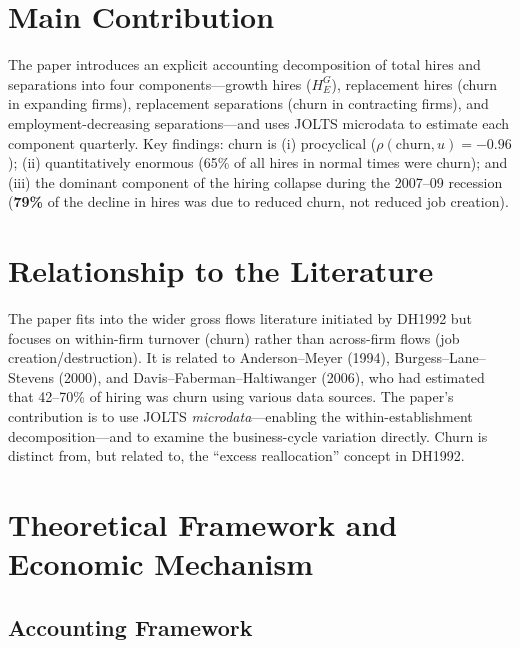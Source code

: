 \section{Main Contribution}

The paper introduces an explicit accounting decomposition of total hires and
separations into four components---growth hires ($H^G_E$), replacement hires
(churn in expanding firms), replacement separations (churn in contracting
firms), and employment-decreasing separations---and uses JOLTS microdata to
estimate each component quarterly. Key findings: churn is (i) procyclical
($\rho(\text{churn},u) = -0.96$); (ii) quantitatively enormous (65\% of all
hires in normal times were churn); and (iii) the dominant component of the
hiring collapse during the 2007--09 recession (\textbf{79\%} of the decline
in hires was due to reduced churn, not reduced job creation).

\section{Relationship to the Literature}

The paper fits into the wider gross flows literature initiated by DH1992 but
focuses on within-firm turnover (churn) rather than across-firm flows (job
creation/destruction). It is related to Anderson--Meyer (1994),
Burgess--Lane--Stevens (2000), and Davis--Faberman--Haltiwanger (2006), who
had estimated that 42--70\% of hiring was churn using various data sources.
The paper's contribution is to use JOLTS \emph{microdata}---enabling the
within-establishment decomposition---and to examine the business-cycle
variation directly. Churn is distinct from, but related to, the ``excess
reallocation'' concept in DH1992.

\section{Theoretical Framework and Economic Mechanism}

\subsection*{Accounting Framework}

